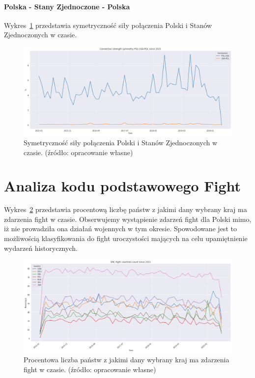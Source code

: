 \documentclass[11pt]{report}
\begin{document}
    \paragraph{Polska - Stany Zjednoczone - Polska}

    Wykres~\ref{fig:POL-USA-POL} przedstawia symetryczność siły połączenia Polski i Stanów Zjednoczonych w czasie.


    \begin{figure}[!htp]
        \centering
        \includegraphics[width=\linewidth]{fig/ConnectionSymmetry/POL-USA-POL.png}
        \caption{Symetryczność siły połączenia Polski i Stanów Zjednoczonych w czasie. (źródło: opracowanie własne)}
        \label{fig:POL-USA-POL}
    \end{figure}


    \section{Analiza kodu podstawowego Fight}\label{sec:analiza-kodu-podstawowego-fight}

    Wykres~\ref{fig:Fight} przedstawia procentową liczbę państw z jakimi dany wybrany kraj ma zdarzenia fight w czasie.
    Obserwujemy wystąpienie zdarzeń fight dla Polski mimo, iż nie prowadziła ona działań wojennych w tym okresie.
    Spowodowane jest to możliwością klasyfikowania do fight uroczystości mających na celu upamiętnienie wydarzeń historycznych.

    \begin{figure}[!htp]
        \centering
        \includegraphics[width=\linewidth]{fig/ERC/Fight.png}
        \caption{Procentowa liczba państw z jakimi dany wybrany kraj ma zdarzenia fight w czasie. (źródło: opracowanie własne)}
        \label{fig:Fight}
    \end{figure}
\end{document}
